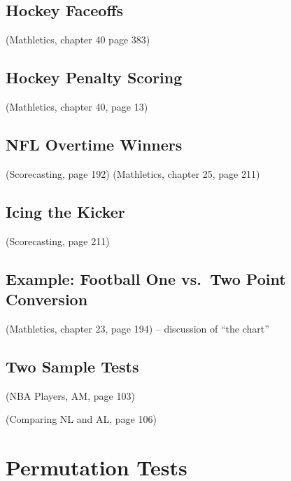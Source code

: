 \documentclass[
  11pt,
]{book}
\theoremstyle{definition}
\theoremstyle{definition}
\theoremstyle{definition}
\theoremstyle{definition}
\theoremstyle{remark}
\begin{document}
\hypertarget{hockey-faceoffs}{%
\subsection{Hockey Faceoffs}\label{hockey-faceoffs}}

(Mathletics, chapter 40 page 383)

\hypertarget{hockey-penalty-scoring}{%
\subsection{Hockey Penalty Scoring}\label{hockey-penalty-scoring}}

(Mathletics, chapter 40, page 13)

\hypertarget{nfl-overtime-winners}{%
\subsection{NFL Overtime Winners}\label{nfl-overtime-winners}}

(Scorecasting, page 192)
(Mathletics, chapter 25, page 211)

\hypertarget{icing-the-kicker}{%
\subsection{Icing the Kicker}\label{icing-the-kicker}}

(Scorecasting, page 211)

\hypertarget{example-football-one-vs.-two-point-conversion}{%
\subsection{Example: Football One vs.~Two Point Conversion}\label{example-football-one-vs.-two-point-conversion}}

(Mathletics, chapter 23, page 194) -- discussion of ``the chart''

\hypertarget{two-sample-tests}{%
\subsection{Two Sample Tests}\label{two-sample-tests}}

(NBA Players, AM, page 103)

(Comparing NL and AL, page 106)

\hypertarget{permutation-tests}{%
\section{Permutation Tests}\label{permutation-tests}}
\end{document}
